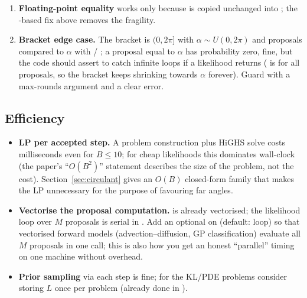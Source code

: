 \documentclass[11pt,a4paper]{article}
\theoremstyle{remark}
\begin{document}
\begin{enumerate}[leftmargin=*]
\item \textbf{Floating-point equality}  works only because  is copied unchanged into ; the -based fix above removes the fragility.
\item \textbf{Bracket edge case.} The bracket is $(0,2\pi]$ with $\alpha\sim U(0,2\pi)$ and proposals compared to $\alpha$ with \code{<} / \code{>=}; a proposal equal to $\alpha$ has probability zero, fine, but the code should assert  to catch infinite loops if a likelihood returns  ( is  for all proposals, so the bracket keeps shrinking towards $\alpha$ forever). Guard with a max-rounds argument and a clear error.
\end{enumerate}

\subsection{Efficiency}
\begin{itemize}[leftmargin=*]
\item \textbf{LP per accepted step.} A  problem construction plus HiGHS solve costs milliseconds even for $B\le 10$; for cheap likelihoods this dominates wall-clock (the paper's ``$O(B^2)$'' statement describes the size of the problem, not the cost). Section~\ref{sec:circulant} gives an $O(B)$ closed-form family that makes the LP unnecessary for the purpose of favouring far angles.
\item \textbf{Vectorise the proposal computation.}  is already vectorised; the likelihood loop over $M$ proposals is serial in . Add an optional  on  (default: loop) so that vectorised forward models (advection--diffusion, GP classification) evaluate all $M$ proposals in one call; this is also how you get an honest ``parallel'' timing on one machine without  overhead.
\item \textbf{Prior sampling} via  each step is fine; for the KL/PDE problems consider storing $L$ once per problem (already done in ).
\end{itemize}
\end{document}
